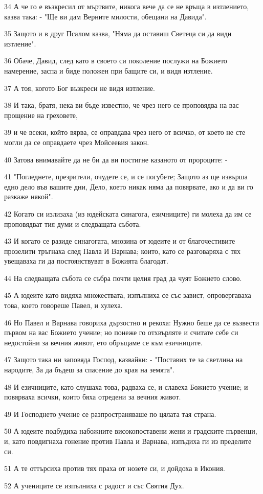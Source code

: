 \par 34 А че го е възкресил от мъртвите, никога вече да се не връща в изтлението, казва така: - "Ще ви дам Верните милости, обещани на Давида".
\par 35 Защото и в друг Псалом казва, "Няма да оставиш Светеца си да види изтление".
\par 36 Обаче, Давид, след като в своето си поколение послужи на Божието намерение, заспа и биде положен при бащите си, и видя изтление.
\par 37 А тоя, когото Бог възкреси не видя изтление.
\par 38 И така, братя, нека ви бъде известно, че чрез него се проповядва на вас прощение на греховете,
\par 39 и че всеки, който вярва, се оправдава чрез него от всичко, от което не сте могли да се оправдаете чрез Мойсеевия закон.
\par 40 Затова внимавайте да не би да ви постигне казаното от пророците: -
\par 41 "Погледнете, презрители, очудете се, и се погубете; Защото аз ще извърша едно дело във вашите дни, Дело, което никак няма да повярвате, ако и да ви го разкаже някой".
\par 42 Когато си излизаха (из юдейската синагога, езичниците) ги молеха да им се проповядват тия думи и следващата събота.
\par 43 И когато се разиде синагогата, мнозина от юдеите и от благочестивите прозелити тръгнаха след Павла И Варнава; които, като се разговаряха с тях увещаваха ги да постоянствуват в Божията благодат.
\par 44 На следващата събота се събра почти целия град да чуят Божието слово.
\par 45 А юдеите като видяха множествата, изпълниха се със завист, опровергаваха това, което говореше Павел, и хулеха.
\par 46 Но Павел и Варнава говориха дързостно и рекоха: Нужно беше да се възвести първом на вас Божието учение; но понеже го отхвърляте и считате себе си недостойни за вечния живот, ето обръщаме се към езичниците.
\par 47 Защото така ни заповяда Господ, казвайки: - "Поставих те за светлина на народите, За да бъдеш за спасение до края на земята".
\par 48 И езичниците, като слушаха това, радваха се, и славеха Божието учение; и повярваха всички, които бяха отредени за вечния живот.
\par 49 И Господнето учение се разпространяваше по цялата тая страна.
\par 50 А юдеите подбудиха набожните високопоставени жени и градските първенци, и, като повдигнаха гонение против Павла и Варнава, изпъдиха ги из пределите си.
\par 51 А те оттърсиха против тях праха от нозете си, и дойдоха в Икония.
\par 52 А учениците се изпълниха с радост и със Святия Дух.

